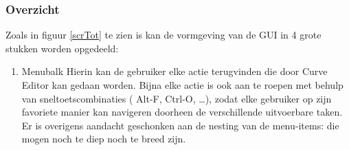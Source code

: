 \documentclass[a4paper,11pt,oneside, titlepage]{article}
\begin{document}
\subsubsection{Overzicht}
Zoals in figuur \ref{scrTot} te zien is kan de vormgeving van de GUI in 4 grote stukken worden opgedeeld:
\begin{enumerate}
\item Menubalk\newline
Hierin kan de gebruiker elke actie terugvinden die door Curve Editor kan gedaan worden.
Bijna elke actie is ook aan te roepen met behulp van sneltoetscombinaties ( Alt-F, Ctrl-O, \ldots ), zodat
elke gebruiker op zijn favoriete manier kan navigeren doorheen de verschillende uitvoerbare taken.
Er is overigens aandacht geschonken aan de nesting van de menu-items: die mogen noch te diep noch te breed zijn.


\end{enumerate}
\end{document}

